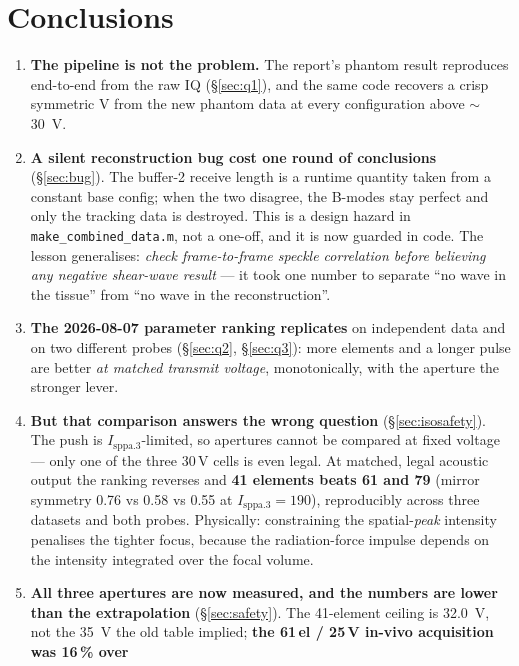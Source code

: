 \documentclass[11pt,a4paper]{article}
\newcommand{\good}[1]{\textcolor{green!45!black}{\textbf{#1}}}
\newcommand{\bad}[1]{\textcolor{red!65!black}{\textbf{#1}}}
\begin{document}
\section{Conclusions}\label{sec:conclusions}
\begin{enumerate}[label=\textbf{C\arabic*.},leftmargin=2.6em]
  \item \textbf{The pipeline is not the problem.} The report's phantom result reproduces end-to-end
  from the raw IQ (\S\ref{sec:q1}), and the same code recovers a crisp symmetric V from the new
  phantom data at every configuration above $\sim$\SI{30}{\volt}.
  \item \textbf{A silent reconstruction bug cost one round of conclusions} (\S\ref{sec:bug}). The
  buffer-2 receive length is a runtime quantity taken from a constant base config; when the two
  disagree, the B-modes stay perfect and only the tracking data is destroyed. This is a design
  hazard in \texttt{make\_combined\_data.m}, not a one-off, and it is now guarded in code. The
  lesson generalises: \emph{check frame-to-frame speckle correlation before believing any negative
  shear-wave result} --- it took one number to separate ``no wave in the tissue'' from ``no wave in
  the reconstruction''.
  \item \textbf{The 2026-08-07 parameter ranking replicates} on independent data and on two
  different probes (\S\ref{sec:q2}, \S\ref{sec:q3}): more elements and a longer pulse are better
  \emph{at matched transmit voltage}, monotonically, with the aperture the stronger lever.
  \item \textbf{But that comparison answers the wrong question} (\S\ref{sec:isosafety}). The push is
  $I_\mathrm{sppa.3}$-limited, so apertures cannot be compared at fixed voltage --- only one of the
  three 30\,V cells is even legal. At matched, legal acoustic output the ranking reverses and
  \good{41 elements beats 61 and 79} (mirror symmetry 0.76 vs 0.58 vs 0.55 at
  $I_\mathrm{sppa.3}=190$), reproducibly across three datasets and both probes. Physically:
  constraining the spatial-\emph{peak} intensity penalises the tighter focus, because the
  radiation-force impulse depends on the intensity integrated over the focal volume.
  \item \textbf{All three apertures are now measured, and the numbers are lower than the
  extrapolation} (\S\ref{sec:safety}). The 41-element ceiling is \SI{32.0}{\volt}, not the
  \SI{35}{\volt} the old table implied; \bad{the 61\,el / 25\,V in-vivo acquisition was 16\,\% over
}
\end{enumerate}
\end{document}
